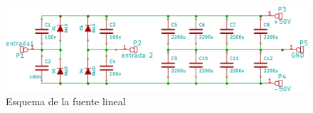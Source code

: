 \bigskip 
\begin{figure}[H]
\centering
\centerline{\includegraphics[scale=0.4]{img/esquema_fuente_lineal.png}}
\caption{Esquema de la fuente lineal}
\end{figure}
